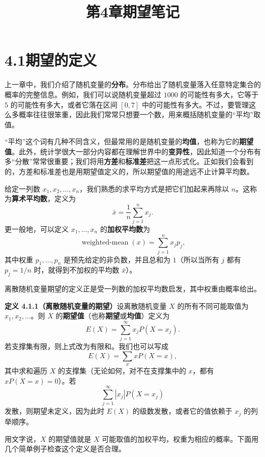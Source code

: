 \documentclass[UTF8,12pt,a4paper,fontset=fandol]{ctexart}
\title{第4章\quad 期望笔记}
\author{}
\date{}
\begin{document}
\maketitle

\section*{4.1\quad 期望的定义}

上一章中，我们介绍了随机变量的\textbf{分布}。分布给出了随机变量落入任意特定集合的概率的完整信息。例如，我们可以说随机变量超过 $1000$ 的可能性有多大，它等于 $5$ 的可能性有多大，或者它落在区间 $[0,7]$ 中的可能性有多大。不过，要管理这么多概率往往很笨重，因此我们常常只想要一个数，用来概括随机变量的“平均”取值。

“平均”这个词有几种不同含义，但最常用的是随机变量的\textbf{均值}，也称为它的\textbf{期望值}。此外，统计学很大一部分内容都在理解世界中的\textbf{变异性}，因此知道一个分布有多“分散”常常很重要；我们将用\textbf{方差}和\textbf{标准差}把这一点形式化。正如我们会看到的，方差和标准差也是用期望值定义的，所以期望值的用途远不止计算平均数。

给定一列数 $x_1,x_2,\ldots,x_n$，我们熟悉的求平均方式是把它们加起来再除以 $n$。这称为\textbf{算术平均数}，定义为
\[
  \bar{x}=\frac{1}{n}\sum_{j=1}^n x_j.
\]
更一般地，可以定义 $x_1,\ldots,x_n$ 的\textbf{加权平均数}为
\[
  \operatorname{weighted\mbox{-}mean}(x)=\sum_{j=1}^n x_jp_j,
\]
其中权重 $p_1,\ldots,p_n$ 是预先给定的非负数，并且总和为 $1$（所以当所有 $j$ 都有 $p_j=1/n$ 时，就得到不加权的平均数 $\bar{x}$）。

离散随机变量期望的定义正是受一列数的加权平均数启发，其中权重由概率给出。

\noindent\textbf{定义 4.1.1（离散随机变量的期望）}\quad 设离散随机变量 $X$ 的所有不同可能取值为 $x_1,x_2,\ldots$。则 $X$ 的\textbf{期望值}（也称\textbf{期望}或\textbf{均值}）定义为
\[
  E(X)=\sum_{j=1}^{\infty}x_jP(X=x_j).
\]
若支撑集有限，则上式改为有限和。我们也可以写成
\[
  E(X)=\sum_x xP(X=x),
\]
其中求和遍历 $X$ 的支撑集（无论如何，对不在支撑集中的 $x$，都有 $xP(X=x)=0$）。若
\[
  \sum_{j=1}^{\infty}|x_j|P(X=x_j)
\]
发散，则期望未定义，因为此时 $E(X)$ 的级数发散，或者它的值依赖于 $x_j$ 的列举顺序。

用文字说，$X$ 的期望值就是 $X$ 可能取值的加权平均，权重为相应的概率。下面用几个简单例子检查这个定义是否合理。
\end{document}
